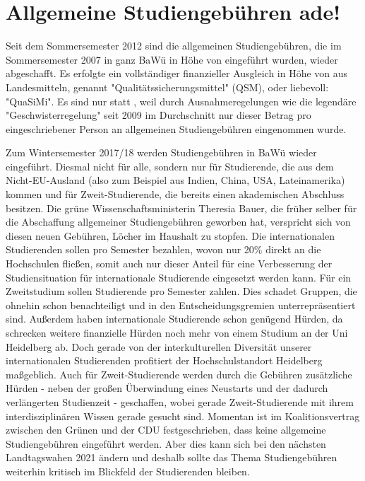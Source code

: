 %

\section{Allgemeine Studiengebühren ade!}
Seit dem Sommersemester 2012 sind die allgemeinen Studiengebühren, die im Sommersemester 2007 in ganz BaWü in Höhe von  eingeführt wurden, wieder abgeschafft. Es erfolgte ein vollständiger finanzieller Ausgleich in Höhe von  aus Landesmitteln, genannt "Qualitätssicherungsmittel" (QSM), oder liebevoll: "QuaSiMi". Es sind nur  statt , weil durch Ausnahmeregelungen wie die legendäre "Geschwisterregelung" seit 2009 im Durchschnitt nur dieser Betrag pro eingeschriebener Person an allgemeinen Studiengebühren eingenommen wurde.

Zum Wintersemester 2017/18 werden Studiengebühren in BaWü wieder eingeführt. Diesmal nicht für alle, sondern nur für Studierende, die aus dem Nicht-EU-Ausland (also zum Beispiel aus Indien, China, USA, Lateinamerika) kommen und für Zweit-Studierende, die bereits einen akademischen Abschluss besitzen. Die grüne Wissenschaftsministerin Theresia Bauer, die früher selber für die Abschaffung allgemeiner Studiengebühren geworben hat, verspricht sich von diesen neuen Gebühren, Löcher im Haushalt zu stopfen. Die internationalen Studierenden sollen  pro Semester bezahlen, wovon nur 20\% direkt an die Hochschulen fließen, somit auch nur dieser Anteil für eine Verbesserung der Studiensituation für internationale Studierende eingesetzt werden kann. Für ein Zweitstudium sollen Studierende  pro Semester zahlen. Dies schadet Gruppen, die ohnehin schon benachteiligt und in den Entscheidungsgremien unterrepräsentiert sind. Außerdem haben internationale Studierende schon genügend Hürden, da schrecken weitere finanzielle Hürden noch mehr von einem Studium an der Uni Heidelberg ab. Doch gerade von der interkulturellen Diversität unserer internationalen Studierenden profitiert der Hochschulstandort Heidelberg maßgeblich. Auch für Zweit-Studierende werden durch die Gebühren zusätzliche Hürden - neben der großen Überwindung eines Neustarts und der dadurch verlängerten Studienzeit - geschaffen, wobei gerade Zweit-Studierende mit ihrem interdisziplinären Wissen gerade gesucht sind. Momentan ist im Koalitionsvertrag zwischen den Grünen und der CDU festgeschrieben, dass keine allgemeine Studiengebühren eingeführt werden. Aber dies kann sich bei den nächsten Landtagswahen 2021 ändern und deshalb sollte das Thema Studiengebühren weiterhin kritisch im Blickfeld der Studierenden bleiben.


